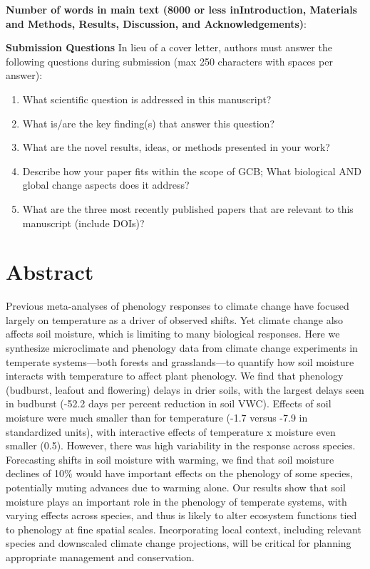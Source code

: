 \documentclass{article}
\begin{document}
\textbf{Number of words in main text (8000 or less inIntroduction, Materials and Methods, Results, Discussion, and Acknowledgements)}: 


\textbf{Submission Questions} In lieu of a cover letter, authors must answer the following questions during submission (max 250 characters with spaces per answer):
\begin{enumerate}
\item What scientific question is addressed in this manuscript?
\item What is/are the key finding(s) that answer this question?
\item What are the novel results, ideas, or methods presented in your work?
\item Describe how your paper fits within the scope of GCB; What biological AND global change aspects does it address?
\item What are the three most recently published papers that are relevant to this manuscript (include DOIs)?
\end{enumerate}



\linenumbers

\section*{Abstract} 
Previous meta-analyses of phenology responses to climate change have focused largely on temperature as a driver of observed shifts. Yet climate change also affects soil moisture, which is limiting to many biological responses. Here we synthesize microclimate and phenology data from climate change experiments in temperate systems---both forests and grasslands---to quantify how soil moisture interacts with temperature to affect plant phenology. 
We find that phenology (budburst, leafout and flowering) delays in drier soils, with the largest delays seen in budburst (-52.2 days per percent reduction in soil VWC). Effects of soil moisture were much smaller than for temperature (-1.7 versus -7.9 in standardized units), with interactive effects of temperature x moisture even smaller (0.5). However, there was high variability in the response across species. Forecasting shifts in soil moisture with warming, we find that soil moisture declines of 10\% would have important effects on the phenology of some species, potentially muting advances due to warming alone. Our results show that soil moisture plays an important role in the phenology of temperate systems, with varying effects across species, and thus is likely to alter ecosystem functions tied to phenology at fine spatial scales. Incorporating local context, including relevant species and downscaled climate change projections, will be critical for planning appropriate management and conservation.
\end{document}
